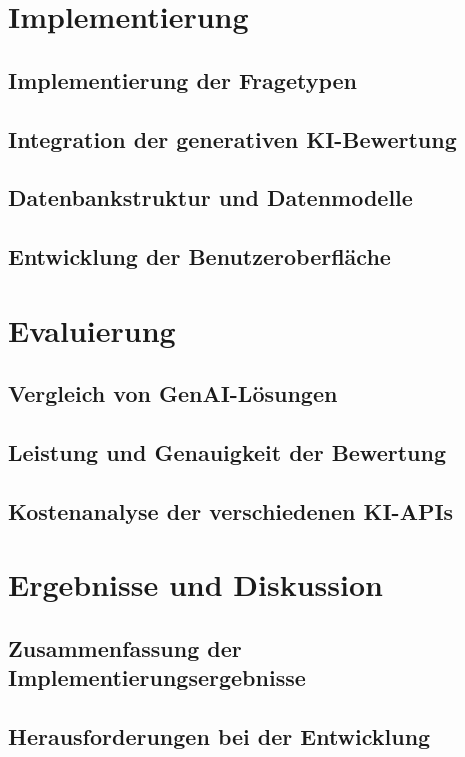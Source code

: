 \documentclass[a4paper,12pt]{article}
\begin{document}
\newpage

\section{Implementierung}
\subsection{Implementierung der Fragetypen}
\subsection{Integration der generativen KI-Bewertung}
\subsection{Datenbankstruktur und Datenmodelle}
\subsection{Entwicklung der Benutzeroberfläche}

\newpage

\section{Evaluierung}
\subsection{Vergleich von GenAI-Lösungen}
\subsection{Leistung und Genauigkeit der Bewertung}
\subsection{Kostenanalyse der verschiedenen KI-APIs}

\newpage

\section{Ergebnisse und Diskussion}
\subsection{Zusammenfassung der Implementierungsergebnisse}
\subsection{Herausforderungen bei der Entwicklung}
\end{document}
